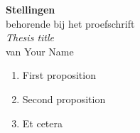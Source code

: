 \documentclass{article}
\begin{document}
\begin{center}
	{\Large \textbf{Stellingen}}
	\\[0.3cm]
	behorende bij het proefschrift
	\\[0.15cm]
	{\large\textit{Thesis title}}
	\\
	van Your Name
\end{center}
\begin{enumerate}
	\item First proposition
	\item Second proposition
	\item Et cetera
\end{enumerate}
\end{document}
